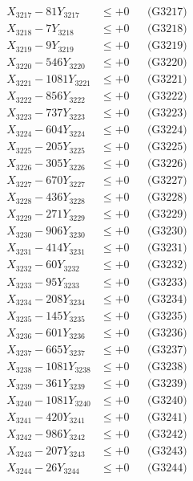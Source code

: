 \documentclass[a4paper,10pt]{article}
\begin{document}
{\begin{align}
X_{3217} - 81Y_{3217} &\leq +0 && \text{(G3217)} \\
X_{3218} - 7Y_{3218} &\leq +0 && \text{(G3218)} \\
X_{3219} - 9Y_{3219} &\leq +0 && \text{(G3219)} \\
X_{3220} - 546Y_{3220} &\leq +0 && \text{(G3220)} \\
\allowbreak
X_{3221} - 1081Y_{3221} &\leq +0 && \text{(G3221)} \\
X_{3222} - 856Y_{3222} &\leq +0 && \text{(G3222)} \\
X_{3223} - 737Y_{3223} &\leq +0 && \text{(G3223)} \\
X_{3224} - 604Y_{3224} &\leq +0 && \text{(G3224)} \\
X_{3225} - 205Y_{3225} &\leq +0 && \text{(G3225)} \\
X_{3226} - 305Y_{3226} &\leq +0 && \text{(G3226)} \\
X_{3227} - 670Y_{3227} &\leq +0 && \text{(G3227)} \\
X_{3228} - 436Y_{3228} &\leq +0 && \text{(G3228)} \\
X_{3229} - 271Y_{3229} &\leq +0 && \text{(G3229)} \\
X_{3230} - 906Y_{3230} &\leq +0 && \text{(G3230)} \\
\allowbreak
X_{3231} - 414Y_{3231} &\leq +0 && \text{(G3231)} \\
X_{3232} - 60Y_{3232} &\leq +0 && \text{(G3232)} \\
X_{3233} - 95Y_{3233} &\leq +0 && \text{(G3233)} \\
X_{3234} - 208Y_{3234} &\leq +0 && \text{(G3234)} \\
X_{3235} - 145Y_{3235} &\leq +0 && \text{(G3235)} \\
X_{3236} - 601Y_{3236} &\leq +0 && \text{(G3236)} \\
X_{3237} - 665Y_{3237} &\leq +0 && \text{(G3237)} \\
X_{3238} - 1081Y_{3238} &\leq +0 && \text{(G3238)} \\
X_{3239} - 361Y_{3239} &\leq +0 && \text{(G3239)} \\
X_{3240} - 1081Y_{3240} &\leq +0 && \text{(G3240)} \\
\allowbreak
X_{3241} - 420Y_{3241} &\leq +0 && \text{(G3241)} \\
X_{3242} - 986Y_{3242} &\leq +0 && \text{(G3242)} \\
X_{3243} - 207Y_{3243} &\leq +0 && \text{(G3243)} \\
X_{3244} - 26Y_{3244} &\leq +0 && \text{(G3244)} \\

\end{align}}
\end{document}
